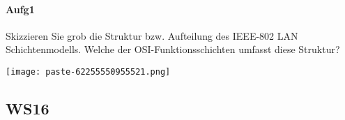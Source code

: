 \documentclass{article}
\begin{document}
\paragraph{Aufg1}
\begin{tcolorbox}[colback=white!10!white,colframe=lightgray!75!black,
  savelowerto=\jobname_ex.tex,breakable,enhanced,lines before break=40]

\justifying
Skizzieren Sie grob die Struktur bzw. Aufteilung des IEEE-802 LAN Schichtenmodells. Welche der OSI-Funktionsschichten umfasst diese Struktur?

\tcblower

\justifying
\begin{center}
\texttt{[image: paste-62255550955521.png]}
\end{center}

\end{tcolorbox}
\subsection{WS16}
\end{document}
